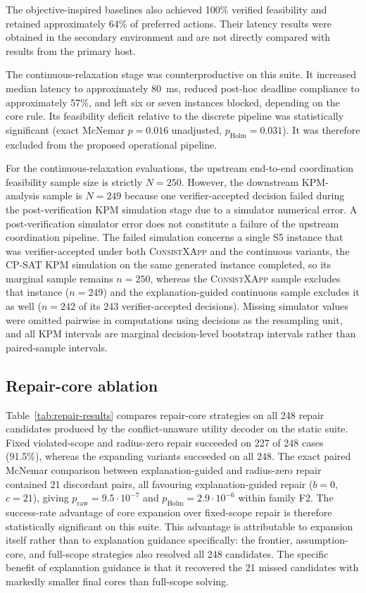 \documentclass[pdflatex,sn-mathphys-num,iicol,oneside]{sn-jnl}
\newcommand{\method}{\textsc{ConsistXApp}\xspace}
\newcommand{\cpsat}{\textsc{CP-SAT}\xspace}
\begin{document}
The objective-inspired baselines also achieved 100\% verified
feasibility and retained approximately 64\% of preferred actions.
Their latency results were obtained in the secondary environment and
are not directly compared with results from the primary host.

The continuous-relaxation stage was counterproductive on this suite.
It increased median latency to approximately 80~ms, reduced post-hoc
deadline compliance to approximately 57\%, and left six or seven
instances blocked, depending on the core rule. Its feasibility deficit relative to the discrete pipeline was statistically significant (exact McNemar $p=0.016$ unadjusted, $p_{\mathrm{Holm}}=0.031$). It was therefore
excluded from the proposed operational pipeline.

For the continuous-relaxation evaluations, the upstream end-to-end coordination feasibility sample size is strictly $N=250$. However, the downstream KPM-analysis sample is $N=249$ because one verifier-accepted decision failed during the post-verification KPM simulation stage due to a simulator numerical error. A post-verification simulator error does not constitute a failure of the upstream coordination pipeline. The failed simulation concerns a single S5 instance that was verifier-accepted under both \method and the continuous variants, the \cpsat KPM simulation on the same generated instance completed, so its marginal sample remains $n=250$, whereas the \method sample excludes that instance ($n=249$) and the explanation-guided continuous sample excludes it as well ($n=242$ of its 243 verifier-accepted decisions). Missing simulator values were omitted pairwise in computations using decisions as the resampling unit, and all KPM intervals are marginal decision-level bootstrap intervals rather than paired-sample intervals.

\subsection{Repair-core ablation}
\label{sec:repair-ablation}

Table~\ref{tab:repair-results} compares repair-core strategies on all 248 repair candidates produced by the conflict-unaware utility decoder on the static suite. Fixed violated-scope and radius-zero repair succeeded on 227 of 248 cases (91.5\%), whereas the expanding variants succeeded on all 248. The exact paired McNemar comparison between explanation-guided and radius-zero repair contained 21 discordant pairs, all favouring explanation-guided repair ($b=0$, $c=21$), giving $p_{\mathrm{raw}}=9.5\cdot 10^{-7}$ and $p_{\mathrm{Holm}}=2.9\cdot 10^{-6}$ within family F2. The success-rate advantage of core expansion over fixed-scope repair is therefore statistically significant on this suite. This advantage is attributable to expansion itself rather than to explanation guidance specifically: the frontier, assumption-core, and full-scope strategies also resolved all 248 candidates. The specific benefit of explanation guidance is that it recovered the 21 missed candidates with markedly smaller final cores than full-scope solving.
\end{document}
